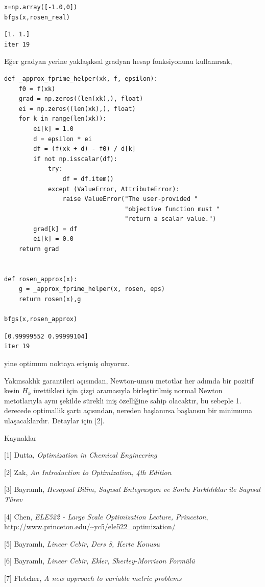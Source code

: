 \documentclass[12pt,fleqn]{article}\usepackage{../../common}
\begin{document}
\begin{verbatim}
x=np.array([-1.0,0])
bfgs(x,rosen_real)    
\end{verbatim}

\begin{verbatim}
[1. 1.]
iter 19
\end{verbatim}

Eğer gradyan yerine yaklaşıksal gradyan hesap fonksiyonunu kullanırsak,

\begin{verbatim}
def _approx_fprime_helper(xk, f, epsilon):
    f0 = f(xk)
    grad = np.zeros((len(xk),), float)
    ei = np.zeros((len(xk),), float)
    for k in range(len(xk)):
        ei[k] = 1.0
        d = epsilon * ei
        df = (f(xk + d) - f0) / d[k]
        if not np.isscalar(df):
            try:
                df = df.item()
            except (ValueError, AttributeError):
                raise ValueError("The user-provided "
                                 "objective function must "
                                 "return a scalar value.")
        grad[k] = df
        ei[k] = 0.0
    return grad


def rosen_approx(x):
    g = _approx_fprime_helper(x, rosen, eps)
    return rosen(x),g

bfgs(x,rosen_approx)
\end{verbatim}

\begin{verbatim}
[0.99999552 0.99999104]
iter 19
\end{verbatim}

yine optimum noktaya erişmiş oluyoruz.

Yakınsaklık garantileri açısından, Newton-umsu metotlar her adımda bir
pozitif kesin $H_k$ ürettikleri için çizgi aramasıyla birleştirilmiş normal
Newton metotlarıyla aynı şekilde sürekli iniş özelliğine sahip olacaktır,
bu sebeple 1. derecede optimallik şartı açısından, nereden başlanırsa
başlansın bir minimuma ulaşacaklardır. Detaylar için [2].

Kaynaklar 

[1] Dutta, {\em Optimization in Chemical Engineering}

[2] Zak, {\em An Introduction to Optimization, 4th Edition}

[3] Bayramlı, {\em Hesapsal Bilim, Sayısal Entegrasyon ve Sonlu Farklılıklar ile Sayısal Türev}

[4] Chen, {\em ELE522 - Large Scale Optimization Lecture, Princeton},
    \url{http://www.princeton.edu/~yc5/ele522_optimization/}

[5] Bayramlı, {\em Lineer Cebir, Ders 8, Kerte Konusu}

[6] Bayramlı, {\em Lineer Cebir, Ekler, Sherley-Morrison Formülü}

[7] Fletcher, {\em A new approach to variable metric problems}
\end{document}
